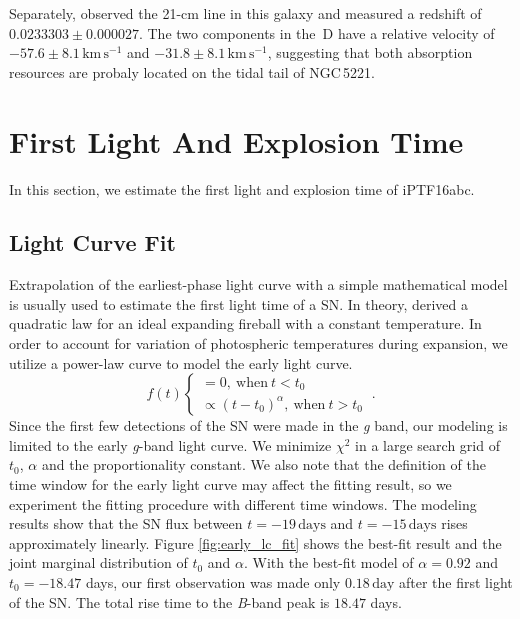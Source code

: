 \documentclass[twocolumn]{aastex61}
\begin{document}
Separately, \citet{1998A&AS..130..333T} observed the 21-cm line in
this galaxy and measured a redshift of $0.0233303\pm0.000027$.  The
two components in the \,D have a relative velocity of
$-57.6\pm8.1\,\textrm{km}\,\textrm{s}^{-1}$ and
$-31.8\pm8.1\,\textrm{km}\,\textrm{s}^{-1}$, suggesting that both
absorption resources are probaly located on the tidal tail of
NGC\,5221.


\section{First Light And Explosion Time}
\label{sec:first_light}

In this section, we estimate the first light and explosion time of
iPTF16abc.

\subsection{Light Curve Fit}
\label{sec:lc_fit}

Extrapolation of the earliest-phase light curve with a simple
mathematical model is usually used to estimate the first light time of
a SN. In theory, \citet{1982ApJ...253..785A} derived a quadratic law
for an ideal expanding fireball with a constant temperature. In order
to account for variation of photospheric temperatures during
expansion, we utilize a power-law curve to model the early light curve.
\begin{equation}
  \label{eq:broken_power_law}
  f(t) \left\{
    \begin{array}{ll}
      = 0,\ \textrm{when}\ t<t_0 \\
      \propto (t-t_0)^{\alpha},\ \textrm{when}\ t>t_0
    \end{array}
  \right.\ .
\end{equation}
Since the first few detections of the SN were made in the \textit{g}
band, our modeling is limited to the early \textit{g}-band light
curve. We minimize $\chi^2$ in a large search grid of $t_0$, $\alpha$
and the proportionality constant. We also note that the definition of
the time window for the early light curve may affect the fitting
result, so we experiment the fitting procedure with different time
windows. The modeling results show that the SN flux between
$t=-19\,\textrm{days}$ and $t=-15\,\textrm{days}$ rises approximately
linearly. Figure \ref{fig:early_lc_fit} shows the best-fit result and
the joint marginal distribution of $t_0$ and $\alpha$. With the
best-fit model of $\alpha=0.92$ and $t_0=-18.47$ days, our first
observation was made only $0.18\,\textrm{day}$ after the first light
of the SN. The total rise time to the \textit{B}-band peak is $18.47$
days.
\end{document}
